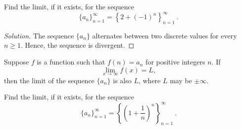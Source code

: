 \documentclass[compacto,10pt,comentarios]{aleph-notas}
\begin{document}
\begin{ejer}
    Find the limit, if it exists, for the sequence
    $$
        \{a_n\}_{n=1}^{\infty} = \left\{ 2 + (-1)^{n} \right\}_{n=1}^{\infty} ~ .
    $$
\end{ejer}
\begin{proof}[Solution]
    The sequence $\{a_n\}$ alternates between two discrete values for every $n \geq 1$. Hence, the sequence is divergent.
\end{proof}

\begin{teo}
    Suppose $f$ is a function such that $f(n) = a_n$ for positive integers $n$. If
    $$
        \lim_{x \to \infty} f(x) = L,
    $$
    then the limit of the sequence $\{a_n\}$ is also $L$, where $L$ may be $\pm \infty$.
\end{teo}
\begin{ejer}
    Find the limit, if it exists, for the sequence
    $$
        \{a_n\}_{n=1}^{\infty} = \left\{ \left( 1 + \frac{1}{n} \right)^{n}  \right\}_{n=1}^{\infty} ~ .
    $$
\end{ejer}
\end{document}
